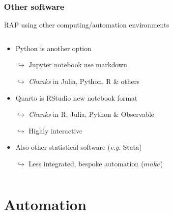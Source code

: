 \documentclass[xcolor=x11names,compress]{beamer}
\renewcommand{\(}{\begin{columns}}
\renewcommand{\)}{\end{columns}}
\newcommand{\<}[1]{\begin{column}{#1}}
\renewcommand{\>}{\end{column}}
\begin{document}
\begin{frame}
\frametitle{Other software}
RAP using other computing/automation environments
\pause
\begin{columns}[t]
 \begin{column}{0.8\textwidth}
 \begin{itemize}[<+->]
        \item Python is another option
        \item[$\hookrightarrow$] Jupyter notebook use markdown
        \item[$\hookrightarrow$] \emph{Chunks} in  Julia, Python, R \& others 
        \item Quarto is RStudio new notebook format
        \item[$\hookrightarrow$]\emph{Chunks} in R, Julia, Python \& Observable
        \item[$\hookrightarrow$] Highly interactive 
        \item Also other statistical software (\emph{e.g.} Stata)
        \item[$\hookrightarrow$] Less integrated, bespoke automation ($make$)
    \end{itemize}
 \end{column}
  \begin{column}{0.2\textwidth}
    \begin{center}
    \begin{itemize}
    \end{itemize}
    \end{center}
  \end{column}
\end{columns}
\end{frame}

\section{Automation}
\end{document}
